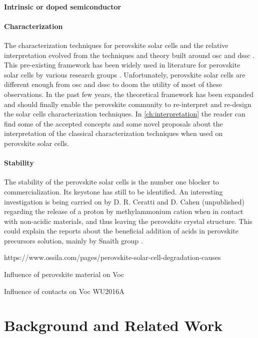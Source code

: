 	\paragraph{Intrinsic or doped semiconductor}


	\paragraph{Characterization}
	The characterization techniques for perovskite solar cells and the relative interpretation evolved from the techniques and theory built around \gls{osc} and \gls{dssc} \cite{Barnes2013}.
	This pre-existing framework has been widely used in literature for perovskite solar cells by various research groups \cite{ORegan2015b,Shao2016,Gelmetti2019,Kiermasch2018,Carnie2015}.
	Unfortunately, perovskite solar cells are different enough from \gls{osc} and \gls{dssc} to doom the utility of most of these observations.
	In the past few years, the theoretical framework has been expanded and should finally enable the perovskite community to re-interpret and re-design the solar cells characterization techniques.
	In \cref{ch:interpretation} the reader can find some of the accepted concepts and some novel proposals about the interpretation of the classical characterization techniques when used on perovskite solar cells.
	
	\paragraph{Stability}
	The stability of the perovskite solar cells is the number one blocker to commercialization. Its keystone has still to be identified. An interesting investigation is being carried on by D. R. Ceratti and D. Cahen (unpublished) regarding the release of a proton by methylammonium cation when in contact with non-acidic materials, and thus leaving the perovskite crystal structure. This could explain the reports about the beneficial addition of acids in perovskite precursors solution, mainly by Snaith group \cite{Noel2017,Zhang2015a,Nayak2016}.
	
	
	https://www.ossila.com/pages/perovskite-solar-cell-degradation-causes
	
	
	

Influence of perovskite material on Voc \cite{Wheeler2017,Eperon2014,Noh2013a}

Influence of contacts on Voc \cite{CorreaBaena2015} WU2016A

\section{Background and Related Work}\label{sec:background}

